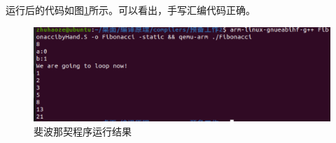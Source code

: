 \documentclass[UTF8,a4paper,10pt]{ctexart}
\begin{document}
运行后的代码如图\ref{fig:1}所示。可以看出，手写汇编代码正确。
\begin{figure}[H]
    \centering
    \includegraphics[scale=0.55]{1.png}
    \caption{斐波那契程序运行结果}
    \label{fig:1}
\end{figure}
\newpage

 
\end{document}
